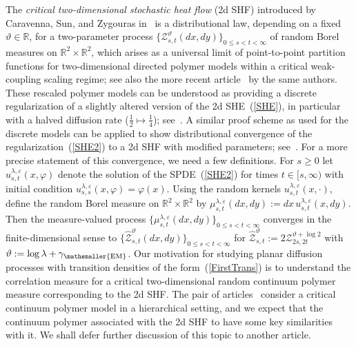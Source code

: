 \documentclass[10pt]{article}
\numberwithin{equation}{section}
\theoremstyle{definition}
\newcommand{\R}{{\mathbb R}}
\begin{document}
The \textit{critical two-dimensional stochastic heat flow} (2d SHF) introduced by Caravenna, Sun, and Zygouras in~\cite{CSZ5}  is a distributional law, depending on a fixed  $\vartheta\in \R$, for  a two-parameter   process  $\{\mathscr{Z}^{\vartheta}_{s,t}(dx,dy)\}_{0\leq s<t < \infty}$ of random Borel measures on $\R^2\times \R^2$, which arises as a universal limit of point-to-point partition functions for  two-dimensional directed polymer models within a  critical weak-coupling scaling regime; see also the more recent article~\cite{CSZ6} by the same authors.  These rescaled polymer models can be understood as providing a discrete regularization of a slightly altered  version of the 2d SHE~(\ref{SHE}), in particular with  a halved diffusion rate ($\frac{1}{2}\mapsto \frac{1}{4}$);  see~\cite[Rmk.\ 1.5]{CSZ5}.  A similar proof scheme as used for the discrete models can be applied to show distributional convergence of the regularization~(\ref{SHE2}) to a  2d SHF with modified parameters; see~\cite[Rmk.\ 1.4]{CSZ5}.  For a more precise statement of this convergence, we need a few definitions.   For  $s\geq 0$ let $ u^{\lambda,\varepsilon}_{s,t}(x,\varphi)$ denote the solution of the SPDE~(\ref{SHE2}) for times $t\in[s,\infty)$ with initial condition $u^{\lambda,\varepsilon}_{s,s}(x,\varphi)=\varphi(x)$. Using the random kernels $u^{\lambda,\varepsilon}_{s,t}(x,\cdot)$, define  the random Borel measure on $\R^2\times \R^2$ by $\mu^{\lambda,\varepsilon}_{s,t}(dx,dy):=dx\, u^{\lambda,\varepsilon}_{s,t}(x,dy)$.  Then the measure-valued process $\{\mu^{\lambda, \varepsilon}_{s,t}(dx,dy)\}_{0\leq s<t < \infty}$  converges in the  finite-dimensional sense to
$\{\widehat{\mathscr{Z}}^{\vartheta}_{s,t}(dx,dy)\}_{0\leq s<t < \infty}$ for $ \widehat{\mathscr{Z}}^{\vartheta}_{s,t}:=2\mathscr{Z}^{\vartheta+\log 2}_{2s,2t} $ with  $\vartheta:= \log \lambda +\gamma_{\mathsmaller{\textup{EM}} }$.  Our motivation for studying  planar diffusion processes  with transition densities of the form~(\ref{FirstTrans}) is to understand the correlation measure for a critical two-dimensional random continuum  polymer measure  corresponding to the 2d SHF.  The pair of articles~\cite{Clark3, Clark4} consider a   critical continuum polymer model in a hierarchical setting, and we  expect that the continuum polymer associated with the 2d SHF to have some key similarities with it. We shall defer further discussion of this topic to another article.    
\end{document}
